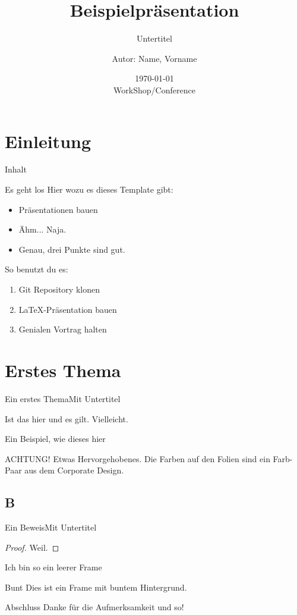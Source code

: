 \documentclass[german,10pt,xcolor=colortbl,compress,aspectratio=169
]{beamer}
\title{Beispielpräsentation}
\subtitle{Untertitel}
\date[]{\today\\[1ex] WorkShop/Conference}
\author[Autor in Fußzeile]{Autor: Name, Vorname}
\institute[]{AG xy\\FB ab\\RPTU in Kaiserslautern}
\begin{document}
\maketitle
\section{Einleitung}
\begin{frame}{Inhalt}
	\tableofcontents
\end{frame}
\begin{frame}{Es geht los}
	Hier wozu es dieses Template gibt:
	\begin{itemize}
		\item Präsentationen bauen
		\item Ähm... Naja.
		\item Genau, drei Punkte sind gut.
	\end{itemize}
	So benutzt du es:
	\begin{enumerate}
		\item Git Repository klonen
		\item \LaTeX-Präsentation bauen
		\item Genialen Vortrag halten
	\end{enumerate}
\end{frame}
\section{Erstes Thema}
\begin{frame}{Ein erstes Thema}{Mit Untertitel}
	\begin{lemma}
		Ist das hier und es gilt. Vielleicht.
	\end{lemma}
	\begin{example}
		Ein Beispiel, wie dieses hier
	\end{example}
	\alert{ACHTUNG!}
	Etwas Hervorgehobenes. Die Farben auf den Folien sind ein Farb-Paar aus dem Corporate Design.\\

\end{frame}
\subsection{B}
\begin{frame}{Ein Beweis}{Mit Untertitel}
	\begin{proof}
		Weil.
	\end{proof}
\end{frame}

\begin{frame}[plain]{}{}%
	Ich bin so ein leerer Frame
\end{frame}

\begin{frame}[coloredbackground]{Bunt}
	Dies ist ein Frame mit buntem Hintergrund.
\end{frame}

\begin{frame}{Abschluss}
	Danke für die Aufmerksamkeit und so!
\end{frame}
\end{document}
